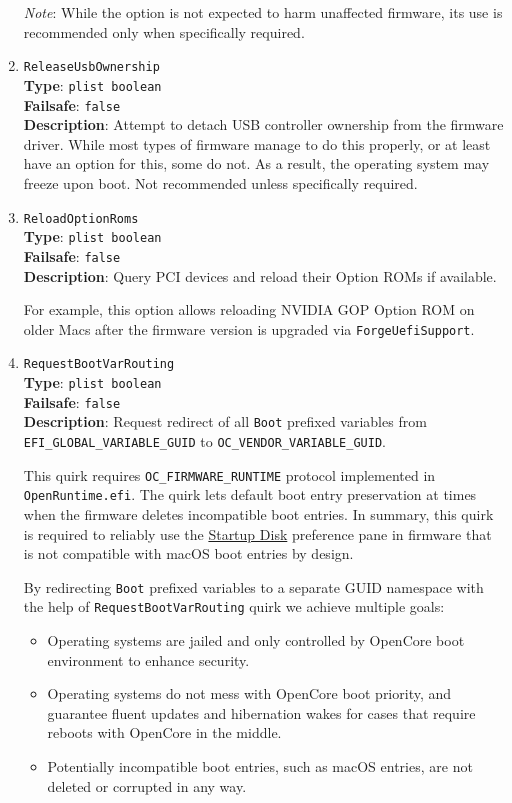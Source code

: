 \documentclass[]{article}
\providecommand{\tightlist}{%
  \setlength{\itemsep}{0pt}\setlength{\parskip}{0pt}}
\begin{document}
\begin{enumerate}
  \emph{Note}: While the option is not expected to harm unaffected firmware,
  its use is recommended only when specifically required.

\item
  \texttt{ReleaseUsbOwnership}\\
  \textbf{Type}: \texttt{plist\ boolean}\\
  \textbf{Failsafe}: \texttt{false}\\
  \textbf{Description}: Attempt to detach USB controller ownership from
  the firmware driver. While most types of firmware manage to do this properly,
  or at least have an option for this, some do not. As a result, the operating
  system may freeze upon boot. Not recommended unless specifically required.

\item
  \texttt{ReloadOptionRoms}\\
  \textbf{Type}: \texttt{plist\ boolean}\\
  \textbf{Failsafe}: \texttt{false}\\
  \textbf{Description}: Query PCI devices and reload their Option ROMs if available.

  For example, this option allows reloading NVIDIA GOP Option ROM on older Macs
  after the firmware version is upgraded via \texttt{ForgeUefiSupport}.

\item
  \texttt{RequestBootVarRouting}\\
  \textbf{Type}: \texttt{plist\ boolean}\\
  \textbf{Failsafe}: \texttt{false}\\
  \textbf{Description}: Request redirect of all \texttt{Boot} prefixed variables from
  \texttt{EFI\_GLOBAL\_VARIABLE\_GUID} to \newline \texttt{OC\_VENDOR\_VARIABLE\_GUID}.

  This quirk requires \texttt{OC\_FIRMWARE\_RUNTIME} protocol implemented
  in \texttt{OpenRuntime.efi}. The quirk lets default boot entry
  preservation at times when the firmware deletes incompatible boot entries.
  In summary, this quirk is required to reliably
  use the \href{https://support.apple.com/HT202796}{Startup Disk} preference
  pane in firmware that is not compatible with macOS boot entries by design.

  By redirecting \texttt{Boot} prefixed variables to a separate GUID namespace
  with the help of \texttt{RequestBootVarRouting} quirk we achieve multiple goals:
  \begin{itemize}
  \tightlist
  \item Operating systems are jailed and only controlled by OpenCore boot
  environment to enhance security.
  \item Operating systems do not mess with OpenCore boot priority, and guarantee
  fluent updates and hibernation wakes for cases that require reboots with OpenCore
  in the middle.
  \item Potentially incompatible boot entries, such as macOS entries, are not deleted
  or corrupted in any way.
  \end{itemize}


\end{enumerate}
\end{document}

